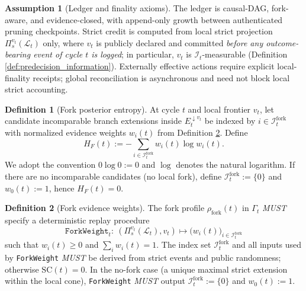 \documentclass[11pt,a4paper]{article}
\newcommand{\cI}{\mathcal{I}}
\newcommand{\cL}{\mathcal{L}}
\theoremstyle{definition}
\newtheorem{definition}{Definition}
\newtheorem{assumption}{Assumption}
\theoremstyle{remark}
\begin{document}
\begin{assumption}[Ledger and finality axioms]\label{ass:ledger}
The ledger is causal-DAG, fork-aware, and evidence-closed, with append-only growth between authenticated pruning checkpoints.
Strict credit is computed from local strict projection $\Pi_s^{v_t}(\cL_t)$ only, where $v_t$ is publicly declared and committed \emph{before any outcome-bearing event of cycle $t$ is logged}; in particular, $v_t$ is $\cI_t$-measurable (Definition \ref{def:predecision_information}).
Externally effective actions require explicit local-finality receipts; global reconciliation is asynchronous and need not block local strict accounting.
\end{assumption}

\begin{definition}[Fork posterior entropy]\label{def:fork_posterior_entropy}
At cycle $t$ and local frontier $v_t$, let candidate incomparable branch extensions inside $E_t^{\downarrow v_t}$ be indexed by $i\in\mathcal I_t^{\mathrm{fork}}$ with normalized evidence weights $w_i(t)$ from Definition \ref{def:fork_evidence_weights}.
Define
\[
H_F(t):=-\sum_{i\in\mathcal I_t^{\mathrm{fork}}} w_i(t)\log w_i(t).
\]
We adopt the convention $0\log 0:=0$ and $\log$ denotes the natural logarithm. If there are no incomparable candidates (no local fork), define $\mathcal I_t^{\mathrm{fork}}:=\{0\}$ and $w_0(t):=1$, hence $H_F(t)=0$.
\end{definition}

\begin{definition}[Fork evidence weights]\label{def:fork_evidence_weights}
The fork profile $\rho_{\mathrm{fork}}(t)$ in $\Gamma_t$ \emph{MUST} specify a deterministic replay procedure
\[
\texttt{ForkWeight}_t:\ (\Pi_s^{v_t}(\cL_t),v_t)\mapsto \big(w_i(t)\big)_{i\in\mathcal I_t^{\mathrm{fork}}}
\]
such that $w_i(t)\ge 0$ and $\sum_{i}w_i(t)=1$.
The index set $\mathcal I_t^{\mathrm{fork}}$ and all inputs used by \texttt{ForkWeight} \emph{MUST} be derived from strict events and public randomness; otherwise $\mathrm{SC}(t)=0$. In the no-fork case (a unique maximal strict extension within the local cone), \texttt{ForkWeight} \emph{MUST} output $\mathcal I_t^{\mathrm{fork}}:=\{0\}$ and $w_0(t):=1$.
\end{definition}
\end{document}
